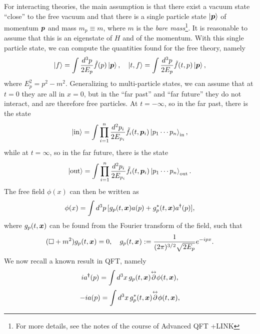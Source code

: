 For interacting theories, the main assumption is that there exist a vacuum state ``close'' to the free vacuum and that there is a single particle state $\ket{\bm{p}}$ of momentum $\bm{p}$ and mass $m_p \equiv m$, where $m$ is the \emph{bare mass}\footnote{For more details, see the notes of the course of Advanced QFT +LINK}. It is reasonable to assume that this is an eigenstate of $H$ and of the momentum. With this single particle state, we can compute the quantities found for the free theory, namely 
\begin{equation}
    \ket{f} = \int\frac{d^3p}{2E_p}\tilde{f}(p)\ket{\bm{p}},\quad \ket{t,f} = \int\frac{d^3p}{2E_p}\tilde{f}(t,p)\ket{\bm{p}},
\end{equation}
where $E_p^2 = p^2 - m^2$. Generalizing to multi-particle states, we can assume that at $t = 0$ they are all in $x = 0$, but in the ``far past'' and ``far future'' they do not interact, and are therefore free particles. At $t = -\infty$, so in the far past, there is the state 
\begin{equation}
    \ket{\mathrm{in}} = \int\prod_{i=1}^n\frac{d^2p_i}{2E_{p_i}}\tilde{f}_i(t,\bm{p}_i)\ket{p_1\cdots p_n}_{\mathrm{in}},
\end{equation}
while at $t = \infty$, so in the far future, there is the state
\begin{equation}
    \ket{\mathrm{out}} = \int\prod_{i=1}^n\frac{d^2p_i}{2E_{p_i}}\tilde{f}_i(t,\bm{p}_i)\ket{p_1\cdots p_n}_{\mathrm{out}}.
\end{equation}
The free field $\phi(x)$ can then be written as 
\begin{equation}
    \phi(x) = \int d^3p\,[g_p(t,\bm{x})a(p) + g_p^*(t,\bm{x})a^\dagger(p)],
\end{equation}
where $g_p(t,\bm{x})$ can be found from the Fourier transform of the field, such that 
\begin{equation}
\label{eq: K-G equation for g_p}
    (\square + m^2)g_p(t,\bm{x}) = 0,\quad g_p(t,\bm{x}) := \frac{1}{(2\pi)^{3/2}\sqrt{2E_p}}e^{-ipx}.
\end{equation}
We now recall a known result in QFT, namely
\begin{equation}
\label{eq: creation operator as a field derivative}
    ia^\dagger(p) = \int d^3x\,g_p(t,\bm{x})\overset{\leftrightarrow}{\partial}\phi(t,\bm{x}),
\end{equation}
\begin{equation}
\label{eq: annihilation operator as a field derivative}
    -ia(p) = \int d^3x\,g_p^*(t,\bm{x})\overset{\leftrightarrow}{\partial}\phi(t,\bm{x}),
\end{equation}
